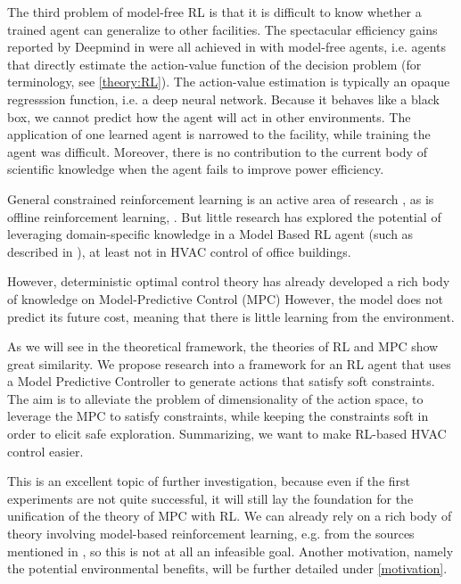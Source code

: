 \documentclass{article}
\theoremstyle{definition}
\theoremstyle{remark}
\begin{document}
The third problem of model-free RL is that it is difficult to know whether a trained agent can generalize to other facilities. The spectacular efficiency gains reported by Deepmind in \cite{gamble_gao_2018, luo2022controlling, evans_gao_2016} were all achieved in with model-free agents, i.e. agents that directly estimate the action-value function of the decision problem (for terminology, see \ref{theory:RL}). The action-value estimation is typically an opaque regresssion function, i.e. a deep neural network. Because it behaves like a black box, we cannot predict how the agent will act in other environments. The application of one learned agent is narrowed to the facility, while training the agent was difficult. Moreover, there is no contribution to the current body of scientific knowledge when the agent fails to improve power efficiency.

General constrained reinforcement learning is an active area of research \cite{agarwal2020optimistic}, as is offline reinforcement learning, \cite{levine2020offline}. But little research has explored the potential of leveraging domain-specific knowledge in a Model Based RL agent (such as described in \cite{Seita_2019}), at least not in HVAC control of office buildings. 

However, deterministic optimal control theory has already developed a rich body of knowledge on Model-Predictive Control (MPC) \cite{Schwenzer_Ay_Bergs_Abel_2021} However, the model does not predict its future cost, meaning that there is little learning from the environment.

As we will see in the theoretical framework, the theories of RL and MPC show great similarity. We propose research into a framework for an RL agent that uses a Model Predictive Controller to generate actions that satisfy soft constraints. The aim is to alleviate the problem of dimensionality of the action space, to leverage the MPC to satisfy constraints, while keeping the constraints soft in order to elicit safe exploration. Summarizing, we want to make RL-based HVAC control easier. 

This is an excellent topic of further investigation, because even if the first experiments are not quite successful, it will still lay the foundation for the unification of the theory of MPC with RL. We can already rely on a rich body of theory involving model-based reinforcement learning, e.g. from the sources mentioned in \cite{Seita_2019}, so this is not at all an infeasible goal. Another motivation, namely the potential environmental benefits, will be further detailed under \ref{motivation}.
\end{document}
